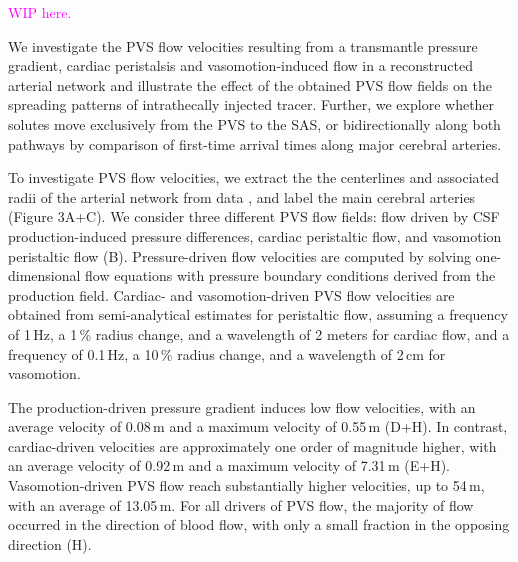 \documentclass[fleqn,10pt]{wlscirep}
\newcommand{\mer}[1]{\textcolor{magenta}{#1}}
\begin{document}
\mer{WIP here.}

We investigate the PVS flow velocities resulting from a transmantle pressure gradient, cardiac peristalsis and vasomotion-induced flow in a reconstructed arterial network and illustrate the effect of the obtained PVS flow fields on the spreading patterns of intrathecally injected tracer. Further, we explore whether solutes move exclusively from the PVS to the SAS, or bidirectionally along both pathways by comparison of first-time arrival times along major cerebral arteries.


To investigate PVS flow velocities, we extract the the centerlines and associated radii of the arterial network from data \cite{hodneland2019new}, and label the main cerebral arteries (Figure 3A+C). We consider three different PVS flow fields: flow driven by CSF production-induced pressure differences, cardiac peristaltic flow, and vasomotion peristaltic flow (B). Pressure-driven flow velocities are computed by solving one-dimensional flow equations with pressure boundary conditions derived from the production field. Cardiac- and vasomotion-driven PVS flow velocities are obtained from semi-analytical estimates for peristaltic flow, assuming a frequency of 1\,Hz, a 1\,\% radius change, and a wavelength of 2 meters for cardiac flow, and a frequency of 0.1\,Hz, a 10\,\% radius change, and a wavelength of 2\,cm for vasomotion.

The production-driven pressure gradient induces low flow velocities, with an average velocity of 0.08\,\textmu m and a maximum velocity of 0.55\,\textmu m (D+H). In contrast, cardiac-driven velocities are approximately one order of magnitude higher, with an average velocity of 0.92\,\textmu m and a maximum velocity of 7.31\,\textmu m (E+H). Vasomotion-driven PVS flow reach substantially higher velocities, up to 54\,\textmu m, with an average of 13.05\,\textmu m. For all drivers of PVS flow, the majority of flow occurred in the direction of blood flow, with only a small fraction in the opposing direction (H).

\end{document}
